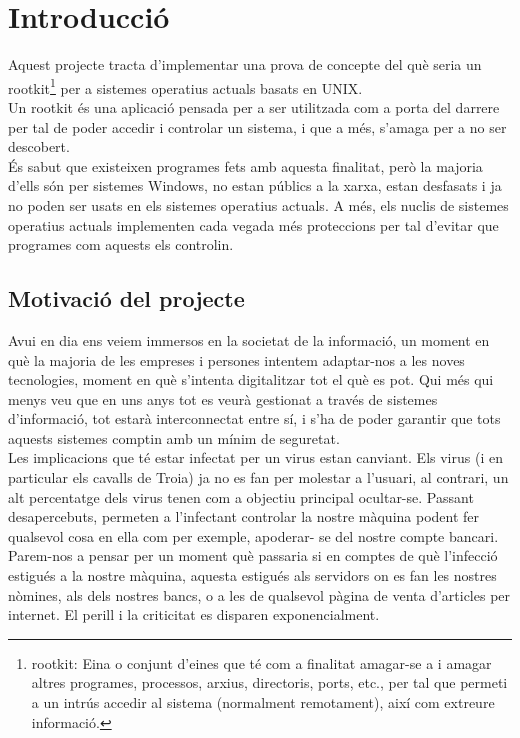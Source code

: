 
\chapter{Introducció}

Aquest projecte tracta d'implementar una prova de concepte del què seria un rootkit\footnote{rootkit:
Eina o conjunt d'eines que té com a finalitat amagar-se a i amagar altres programes, processos, arxius, 
directoris, ports, etc., per tal que permeti a un intrús accedir al sistema (normalment remotament), 
així com extreure informació.} per a sistemes operatius actuals basats en UNIX.\\ 

Un rootkit és una aplicació pensada per a ser utilitzada com a porta del darrere per tal de
poder accedir i controlar un sistema, i que a més, s'amaga per a no ser descobert.\\

És sabut que existeixen programes fets amb aquesta finalitat, però la majoria d'ells són
per sistemes Windows, no estan públics a la xarxa, estan desfasats i ja no poden ser
usats en els sistemes operatius actuals. A més, els nuclis de sistemes operatius actuals implementen cada vegada més
proteccions per tal d'evitar que programes com aquests els controlin.

\section{Motivació del projecte}

Avui en dia ens veiem immersos en la societat de la informació, un moment en què la
majoria de les empreses i persones intentem adaptar-nos a les noves tecnologies,
moment en què s'intenta digitalitzar tot el què es pot. Qui més qui menys veu que en uns anys tot es veurà gestionat a través de sistemes
d'informació, tot estarà interconnectat entre sí, i s'ha de poder garantir que tots aquests
sistemes comptin amb un mínim de seguretat.\\


Les implicacions que té estar infectat per un virus estan canviant. Els virus (i en particular
els cavalls de Troia) ja no es fan per molestar a l'usuari, al contrari, un alt percentatge dels
virus tenen com a objectiu principal ocultar-se. Passant desapercebuts, permeten a l'infectant
controlar la nostre màquina podent fer qualsevol cosa en ella com per exemple, apoderar-
se del nostre compte bancari.\\
Parem-nos a pensar per un moment què passaria si en comptes de què l'infecció estigués
a la nostre màquina, aquesta estigués als servidors on es fan les nostres nòmines, als dels
nostres bancs, o a les de qualsevol pàgina de venta d'articles per internet. El perill i la
criticitat es disparen exponencialment.\\


